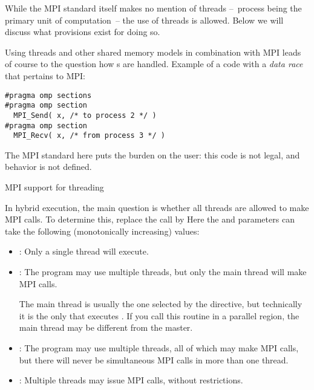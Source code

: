 
While the MPI standard itself makes no mention of threads
--~process being the primary unit of computation~--
the use of threads is allowed.
Below we will discuss what provisions exist for doing so.

Using threads and other shared memory models in combination with MPI
leads of course to the question how
s are handled.
Example of a code with a
\emph{data race}
that pertains to MPI:
\begin{lstlisting}
#pragma omp sections
#pragma omp section
  MPI_Send( x, /* to process 2 */ )
#pragma omp section
  MPI_Recv( x, /* from process 3 */ )
\end{lstlisting}
The MPI standard here puts the burden on the user:
this code is not legal, and behavior is not defined.

 {MPI support for threading}
\label{sec:init-thread}
\label{sec:ref:mpi-thread}


In hybrid execution, the main question is whether all threads
are allowed to make MPI calls. To determine this,
replace the  call by
%
%
Here the  and  parameters can take the following
(monotonically increasing) values:
\begin{itemize}
\item {}: Only a single thread will
  execute.
\item{}: The program may use multiple
  threads, but only the main thread will make MPI calls.

    The main thread is usually the one selected by the
     directive, but technically it is the only that
    executes . If you call this routine in
    a parallel region, the main thread may be different from the master.
\item{}: The program may use multiple
  threads, all of which may make MPI calls, but there will never be
  simultaneous MPI calls in more than one thread.
\item{}: Multiple threads may issue MPI
  calls, without restrictions.
\end{itemize}

